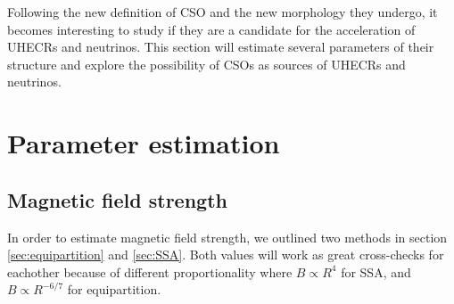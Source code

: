 \label{sec:CSO_UHECR}
Following the new definition of CSO and the new morphology they undergo, it becomes interesting to study if they are a candidate for the acceleration of UHECRs and neutrinos. This section will estimate several parameters of their structure and explore the possibility of CSOs as sources of UHECRs and neutrinos. 

\section{Parameter estimation}
\subsection{Magnetic field strength}


In order to estimate magnetic field strength, we outlined two methods in section \ref{sec:equipartition} and \ref{sec:SSA}. Both values will work as great cross-checks for eachother because of different proportionality where $B \propto R^{4}$ for SSA, and $B \propto R^{-6/7}$ for equipartition.


